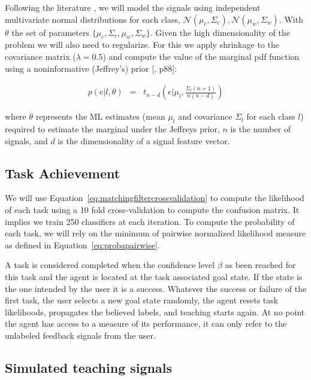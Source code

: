 Following the literature \cite{blankertz2010single}, we will model the signals using independent multivariate normal distributions for each class, $\mathcal{N}(\mu_c, \Sigma_c), \mathcal{N}(\mu_w, \Sigma_w)$. With $\theta$ the set of parameters $\{\mu_c, \Sigma_c,\mu_w, \Sigma_w\}$. Given the high dimensionality of the problem we will also need to regularize. For this we apply shrinkage to the covariance matrix ($\lambda = 0.5$) and compute the value of the marginal pdf function using a noninformative (Jeffrey's) prior [\cite{gelman2003bayesian}, p88]:

\begin{eqnarray}
p(e|l, \theta) & = & t_{n-d}(e | \mu_l,\frac{\Sigma_l (n+1)}{n(n-d)})
\label{eq:prior}
\end{eqnarray}

where $\theta$ represents the ML estimates (mean $\mu_l$ and covariance $\Sigma_l$ for each class $l$) required to estimate the marginal under the Jeffreys prior, $n$ is the number of signals, and $d$ is the dimensionality of a signal feature vector.

\subsection{Task Achievement}

We will use Equation~\ref{eq:matchingfiltercrossvalidation} to compute the likelihood of each task using a 10 fold cross-validation to compute the confusion matrix. It implies we train 250 classifiers at each iteration. To compute the probability of each task, we will rely on the minimum of pairwise normalized likelihood measure as defined in Equation~\ref{eq:probapairwise}.

A task is considered completed when the confidence level $\beta$ as been reached for this task and the agent is located at the task associated goal state. If the state is the one intended by the user it is a success. Whatever the success or failure of the first task, the user selects a new goal state randomly, the agent resets task likelihoods, propagates the believed labels, and teaching starts again. At no point the agent has access to a measure of its performance, it can only refer to the unlabeled feedback signals from the user.

\subsection{Simulated teaching signals}

